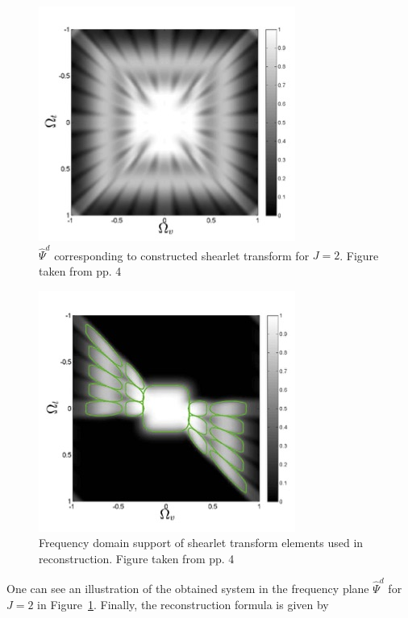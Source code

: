 \begin{figure}[h!]
\centering
\includegraphics[width = 0.7 \textwidth]{./Diagrams/LFshearlets2e.jpg}
\caption{$\hat{\Psi}^d$ corresponding to constructed shearlet transform for $J=2$. Figure taken from \cite{LF-Shearlets} pp. 4}
\label{fig:LFshearlets2e}
\end{figure}

\begin{figure}[h!]
\centering
\includegraphics[width = 0.7 \textwidth]{./Diagrams/LFshearlets2f.jpg}
\caption{Frequency domain support of shearlet transform elements used in reconstruction. Figure taken from \cite{LF-Shearlets} pp. 4}
\label{fig:LFshearlets2f}
\end{figure}

One can see an illustration of the obtained system in the frequency plane $\hat{\Psi}^d$ for $J=2$ in Figure~\ref{fig:LFshearlets2e}. Finally, the reconstruction formula is given by

